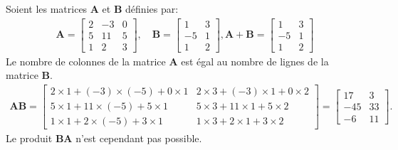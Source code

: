\documentclass[letterpaper,11pt,english]{sphinxmanual}
\begin{document}
\sphinxAtStartPar
{} Soient les matrices \(\mathbf{A}\) et
\(\mathbf{B}\) définies par:
\begin{equation}\label{equation:chapter2:chapter2:4}
\begin{split}\mathbf{A} = \begin{bmatrix}
2 & -3 & 0\\
5 &11 & 5\\
1& 2 & 3
\end{bmatrix}, \quad \mathbf{B} = \begin{bmatrix}
1 & 3\\
-5 &1\\
1 & 2
\end{bmatrix},
\mathbf{A}+\mathbf{B} = \begin{bmatrix}
1 & 3\\
-5 &1\\
1 & 2
\end{bmatrix}\end{split}
\end{equation}
\sphinxAtStartPar
Le nombre de colonnes de la matrice \(\mathbf{A}\) est égal au
nombre de lignes de la matrice \(\mathbf{B}\).
\begin{equation}\label{equation:chapter2:chapter2:5}
\begin{split}\mathbf{AB} = \begin{bmatrix}
2\times1+(-3)\times(-5)+0\times1 & 2\times3+(-3)\times1+0\times2\\
5\times1+11\times(-5)+5\times1 &5\times3+11\times1+5\times2\\
1\times1+2\times(-5)+3\times1& 1\times3+2\times1+3\times2
\end{bmatrix} = \begin{bmatrix}
17 & 3\\
-45 &33\\
-6 & 11
\end{bmatrix}.\end{split}
\end{equation}
\sphinxAtStartPar
Le produit \(\mathbf{BA}\) n’est cependant pas possible.
\end{document}
